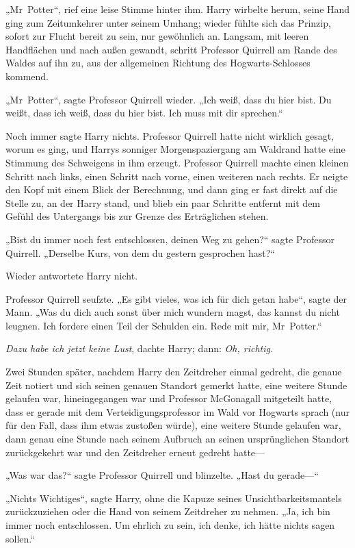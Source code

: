{„Mr~Potter“, rief eine leise Stimme hinter ihm. Harry wirbelte herum, seine Hand ging zum Zeitumkehrer unter seinem Umhang; wieder fühlte sich das Prinzip, sofort zur Flucht bereit zu sein, nur gewöhnlich an. Langsam, mit leeren Handflächen und nach außen gewandt, schritt Professor Quirrell am Rande des Waldes auf ihn zu, aus der allgemeinen Richtung des Hogwarts-Schlosses kommend.

„Mr~Potter“, sagte Professor Quirrell wieder. „Ich weiß, dass du hier bist. Du weißt, dass ich weiß, dass du hier bist. Ich muss mit dir sprechen.“

Noch immer sagte Harry nichts. Professor Quirrell hatte nicht wirklich gesagt, worum es ging, und Harrys sonniger Morgenspaziergang am Waldrand hatte eine Stimmung des Schweigens in ihm erzeugt. Professor Quirrell machte einen kleinen Schritt nach links, einen Schritt nach vorne, einen weiteren nach rechts. Er neigte den Kopf mit einem Blick der Berechnung, und dann ging er fast direkt auf die Stelle zu, an der Harry stand, und blieb ein paar Schritte entfernt mit dem Gefühl des Untergangs bis zur Grenze des Erträglichen stehen.

„Bist du immer noch fest entschlossen, deinen Weg zu gehen?“ sagte Professor Quirrell. „Derselbe Kurs, von dem du gestern gesprochen hast?“

Wieder antwortete Harry nicht.

Professor Quirrell seufzte. „Es gibt vieles, was ich für dich getan habe“, sagte der Mann. „Was du dich auch sonst über mich wundern magst, das kannst du nicht leugnen. Ich fordere einen Teil der Schulden ein. Rede mit mir, Mr~Potter.“

\emph{Dazu habe ich jetzt keine Lust}, dachte Harry; dann: \emph{Oh, richtig.}

Zwei Stunden später, nachdem Harry den Zeitdreher einmal gedreht, die genaue Zeit notiert und sich seinen genauen Standort gemerkt hatte, eine weitere Stunde gelaufen war, hineingegangen war und Professor McGonagall mitgeteilt hatte, dass er gerade mit dem Verteidigungsprofessor im Wald vor Hogwarts sprach (nur für den Fall, dass ihm etwas zustoßen würde), eine weitere Stunde gelaufen war, dann genau eine Stunde nach seinem Aufbruch an seinen ursprünglichen Standort zurückgekehrt war und den Zeitdreher erneut gedreht hatte—

„Was war das?“ sagte Professor Quirrell und blinzelte. „Hast du gerade—“

„Nichts Wichtiges“, sagte Harry, ohne die Kapuze seines Unsichtbarkeitsmantels zurückzuziehen oder die Hand von seinem Zeitdreher zu nehmen. „Ja, ich bin immer noch entschlossen. Um ehrlich zu sein, ich denke, ich hätte nichts sagen sollen.“

}
